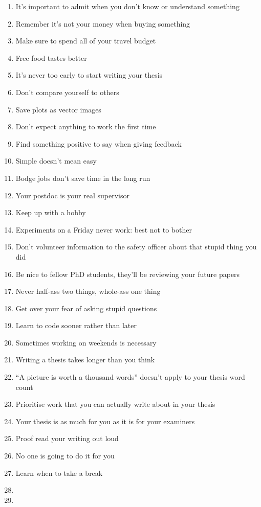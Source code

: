 \begin{enumerate}
	\item It's important to admit when you don't know or understand something
	\item Remember it's not your money when buying something
	\item Make sure to spend all of your travel budget
	\item Free food tastes better
	\item It's never too early to start writing your thesis
	\item Don't compare yourself to others
	\item Save plots as vector images
	\item Don't expect anything to work the first time
	\item Find something positive to say when giving feedback
	\item Simple doesn't mean easy
	\item Bodge jobs don't save time in the long run
	\item Your postdoc is your real supervisor
	\item Keep up with a hobby
	\item Experiments on a Friday never work: best not to bother
	\item Don't volunteer information to the safety officer about that stupid thing you did 
	\item Be nice to fellow PhD students, they'll be reviewing your future papers
	\item Never half-ass two things, whole-ass one thing
	\item Get over your fear of asking stupid questions
	\item Learn to code sooner rather than later
	\item Sometimes working on weekends is necessary
	\item Writing a thesis takes longer than you think
	\item ``A picture is worth a thousand words'' doesn't apply to your thesis word count
	\item Prioritise work that you can actually write about in your thesis
	\item Your thesis is as much for you as it is for your examiners 
	\item Proof read your writing out loud
	\item No one is going to do it for you
	\item Learn when to take a break
	\item
	\item

\end{enumerate}
